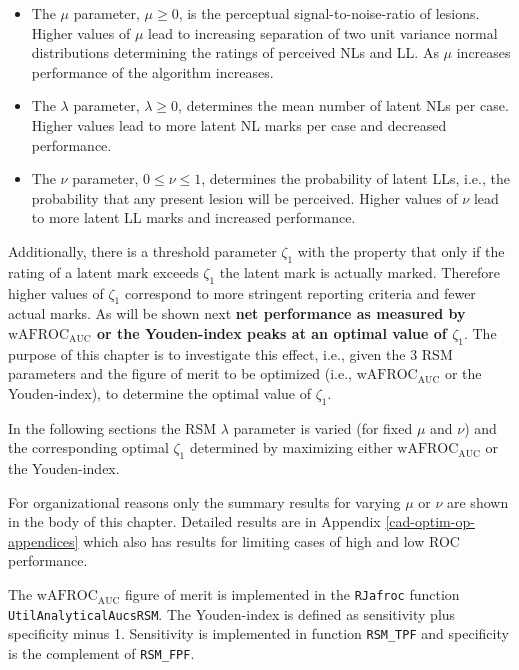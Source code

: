 \documentclass[
]{book}
\begin{document}
\begin{itemize}
\item
  The \(\mu\) parameter, \(\mu \ge 0\), is the perceptual signal-to-noise-ratio of lesions. Higher values of \(\mu\) lead to increasing separation of two unit variance normal distributions determining the ratings of perceived NLs and LL. As \(\mu\) increases performance of the algorithm increases.
\item
  The \(\lambda\) parameter, \(\lambda \ge 0\), determines the mean number of latent NLs per case. Higher values lead to more latent NL marks per case and decreased performance.
\item
  The \(\nu\) parameter, \(0 \le \nu \le 1\), determines the probability of latent LLs, i.e., the probability that any present lesion will be perceived. Higher values of \(\nu\) lead to more latent LL marks and increased performance.
\end{itemize}

Additionally, there is a threshold parameter \(\zeta_1\) with the property that only if the rating of a latent mark exceeds \(\zeta_1\) the latent mark is actually marked. Therefore higher values of \(\zeta_1\) correspond to more stringent reporting criteria and fewer actual marks. As will be shown next \textbf{net performance as measured by \(\text{wAFROC}_\text{AUC}\) or the Youden-index peaks at an optimal value of \(\zeta_1\)}. The purpose of this chapter is to investigate this effect, i.e., given the 3 RSM parameters and the figure of merit to be optimized (i.e., \(\text{wAFROC}_\text{AUC}\) or the Youden-index), to determine the optimal value of \(\zeta_1\).

In the following sections the RSM \(\lambda\) parameter is varied (for fixed \(\mu\) and \(\nu\)) and the corresponding optimal \(\zeta_1\) determined by maximizing either \(\text{wAFROC}_\text{AUC}\) or the Youden-index.

For organizational reasons only the summary results for varying \(\mu\) or \(\nu\) are shown in the body of this chapter. Detailed results are in Appendix \ref{cad-optim-op-appendices} which also has results for limiting cases of high and low ROC performance.

The \(\text{wAFROC}_\text{AUC}\) figure of merit is implemented in the \texttt{RJafroc} function \texttt{UtilAnalyticalAucsRSM}. The Youden-index is defined as sensitivity plus specificity minus 1. Sensitivity is implemented in function \texttt{RSM\_TPF} and specificity is the complement of \texttt{RSM\_FPF}.
\end{document}
